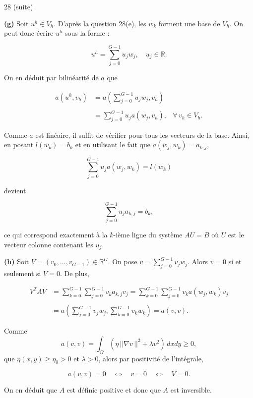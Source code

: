 \begin{reponse}{28 (suite)}
\begin{enumerate}
    \end{enumerate}

    \vspace{0.8em}
    \textbf{(g)} Soit $u^h \in V_h$. D'après la question 28(e), les $w_k$ forment une base de $V_h$. On peut donc écrire $u^h$ sous la forme :

    \[
        u^h= \sum_{j=0}^{G-1} u_jw_j, \quad u_j \in \mathbb{R}.
    \]

    On en déduit par bilinéarité de $a$ que

    \begin{align*}
        a\left(u^h,v_h\right) & = a\left(\sum_{j=0}^{G-1} u_jw_j,v_h\right) & \\ \\
        &= \sum_{j=0}^{G-1} u_j a(w_j,v_h), & \forall \, v_h \in V_h.
    \end{align*}

    Comme $a$ est linéaire, il suffit de vérifier pour tous les vecteurs de la base. Ainsi, en posant $l(w_k) = b_k$ et en utilisant le fait que $a(w_j,w_k)=a_{k,j}$,

    \[
        \sum_{j=0}^{G-1} u_j a(w_j,w_k) = l(w_k)
    \]

    devient

    \[
        \sum_{j=0}^{G-1} u_j a_{k,j} = b_k,
    \]

    ce qui correspond exactement à la $k$-ième ligne du système $AU=B$ où $U$ est le vecteur colonne contenant les $u_j$.


    \vspace{0.8em}
    \textbf{(h)} Soit $V = (v_0,\dots, v_{G-1}) \in \mathbb{R}^G$. On pose $v = \sum\limits_{j=0}^{G-1} v_jw_j$. Alors $v=0$ si et seulement si $V=0$. De plus,

    \begin{align*}
        V^TAV & = \sum_{k=0}^{G-1}\sum_{j=0}^{G-1}v_ka_{k,j}v_j = \sum_{k=0}^{G-1}\sum_{j=0}^{G-1} v_k a(w_j,w_k)v_j \\ \\
        &= a\left(\sum_{j=0}^{G-1} v_jw_j,\sum_{k=0}^{G-1} v_kw_k\right) = a(v,v).
    \end{align*}

    Comme $$a(v,v) = \int_\Omega (\eta \, \vert \vert \nabla v \, \vert \vert ^2 + \lambda v^2) \, dxdy \geq0,$$ que $\eta(x,y) \geq \eta_0 > 0$ et $\lambda > 0$, alors par positivité de l'intégrale,

    \[
        a(v,v) = 0 \quad \Longleftrightarrow \quad v=0 \quad \Longleftrightarrow \quad V=0.
    \]

    On en déduit que $A$ est définie positive et donc que $A$ est inversible.
\end{reponse}

